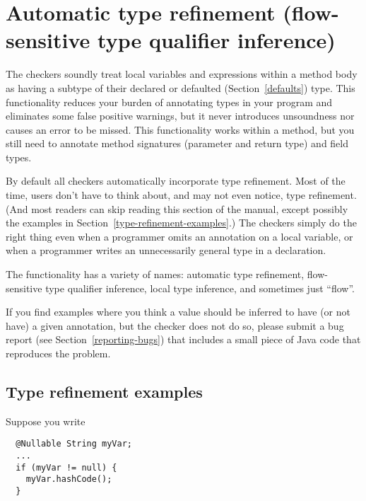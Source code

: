 

\section{Automatic type refinement (flow-sensitive type qualifier inference)\label{type-refinement}}

The
checkers soundly treat local variables and expressions within a method body as having a
subtype of their declared or defaulted (Section~\ref{defaults})
type.
This functionality
reduces your burden of annotating types in your program and
eliminates some false positive warnings, but it
never introduces unsoundness nor causes an error to be missed.
This functionality works within a method, but you still need to
annotate method signatures (parameter and return type) and field types.

By default all checkers
automatically incorporate type refinement.  Most of the time, users don't
have to think about, and may not even notice, type refinement.
(And most readers can skip reading this section of the manual, except
possibly the examples in Section~\ref{type-refinement-examples}.)
The
checkers simply do the right thing even when a programmer omits an
annotation on a local variable, or when a programmer writes an
unnecessarily general type in a declaration.

The functionality has a variety of names:  automatic type refinement,
flow-sensitive type qualifier inference, local type inference, and
sometimes just ``flow''.

If you find examples where you think a value should be inferred to have
(or not have) a
given annotation, but the checker does not do so, please submit a bug
report (see Section~\ref{reporting-bugs}) that includes a small piece of
Java code that reproduces the problem.


\subsection{Type refinement examples\label{type-refinement-examples}}

Suppose you write

\begin{Verbatim}
  @Nullable String myVar;
  ...
  if (myVar != null) {
    myVar.hashCode();
  }
\end{Verbatim}

